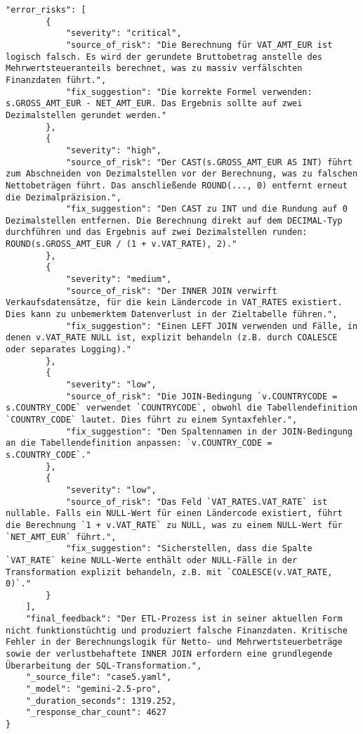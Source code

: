\begin{lstlisting}[caption={Ausgabe: Gemini 2.5 Pro Anwendungsfall 5 Hauptdurchlauf},label={gemini_case5_prompt1}]
    "error_risks": [
        {
            "severity": "critical",
            "source_of_risk": "Die Berechnung für VAT_AMT_EUR ist logisch falsch. Es wird der gerundete Bruttobetrag anstelle des Mehrwertsteueranteils berechnet, was zu massiv verfälschten Finanzdaten führt.",
            "fix_suggestion": "Die korrekte Formel verwenden: s.GROSS_AMT_EUR - NET_AMT_EUR. Das Ergebnis sollte auf zwei Dezimalstellen gerundet werden."
        },
        {
            "severity": "high",
            "source_of_risk": "Der CAST(s.GROSS_AMT_EUR AS INT) führt zum Abschneiden von Dezimalstellen vor der Berechnung, was zu falschen Nettobeträgen führt. Das anschließende ROUND(..., 0) entfernt erneut die Dezimalpräzision.",
            "fix_suggestion": "Den CAST zu INT und die Rundung auf 0 Dezimalstellen entfernen. Die Berechnung direkt auf dem DECIMAL-Typ durchführen und das Ergebnis auf zwei Dezimalstellen runden: ROUND(s.GROSS_AMT_EUR / (1 + v.VAT_RATE), 2)."
        },
        {
            "severity": "medium",
            "source_of_risk": "Der INNER JOIN verwirft Verkaufsdatensätze, für die kein Ländercode in VAT_RATES existiert. Dies kann zu unbemerktem Datenverlust in der Zieltabelle führen.",
            "fix_suggestion": "Einen LEFT JOIN verwenden und Fälle, in denen v.VAT_RATE NULL ist, explizit behandeln (z.B. durch COALESCE oder separates Logging)."
        },
        {
            "severity": "low",
            "source_of_risk": "Die JOIN-Bedingung `v.COUNTRYCODE = s.COUNTRY_CODE` verwendet `COUNTRYCODE`, obwohl die Tabellendefinition `COUNTRY_CODE` lautet. Dies führt zu einem Syntaxfehler.",
            "fix_suggestion": "Den Spaltennamen in der JOIN-Bedingung an die Tabellendefinition anpassen: `v.COUNTRY_CODE = s.COUNTRY_CODE`."
        },
        {
            "severity": "low",
            "source_of_risk": "Das Feld `VAT_RATES.VAT_RATE` ist nullable. Falls ein NULL-Wert für einen Ländercode existiert, führt die Berechnung `1 + v.VAT_RATE` zu NULL, was zu einem NULL-Wert für `NET_AMT_EUR` führt.",
            "fix_suggestion": "Sicherstellen, dass die Spalte `VAT_RATE` keine NULL-Werte enthält oder NULL-Fälle in der Transformation explizit behandeln, z.B. mit `COALESCE(v.VAT_RATE, 0)`."
        }
    ],
    "final_feedback": "Der ETL-Prozess ist in seiner aktuellen Form nicht funktionstüchtig und produziert falsche Finanzdaten. Kritische Fehler in der Berechnungslogik für Netto- und Mehrwertsteuerbeträge sowie der verlustbehaftete INNER JOIN erfordern eine grundlegende Überarbeitung der SQL-Transformation.",
    "_source_file": "case5.yaml",
    "_model": "gemini-2.5-pro",
    "_duration_seconds": 1319.252,
    "_response_char_count": 4627
}
\end{lstlisting}

